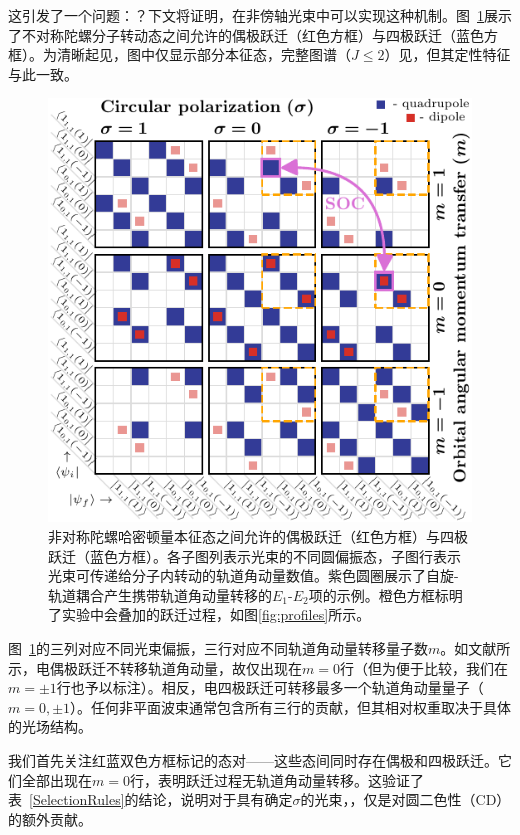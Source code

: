 \documentclass[reprint,aps,prl,twocolumn,superscriptaddress,groupedaddress]{revtex4-2}
\newcommand{\eoet}{$E_1$-$E_2$}
\begin{document}
这引发了一个问题：？下文将证明，在非傍轴光束中可以实现这种机制。图~\ref{fig:gridJ1}展示了不对称陀螺分子转动态之间允许的偶极跃迁（红色方框）与四极跃迁（蓝色方框）。为清晰起见，图中仅显示部分本征态，完整图谱（$J\leq 2$）见\cite{Note1}，但其定性特征与此一致。

\begin{figure}[ht!]
    \centering
    \includegraphics[width=\linewidth]{Figure1.pdf}
    \caption{非对称陀螺哈密顿量本征态之间允许的偶极跃迁（红色方框）与四极跃迁（蓝色方框）。各子图列表示光束的不同圆偏振态，子图行表示光束可传递给分子内转动的轨道角动量数值。紫色圆圈展示了自旋-轨道耦合产生携带轨道角动量转移的\eoet 项的示例。橙色方框标明了实验中会叠加的跃迁过程，如图\ref{fig:profiles}所示。}
    \label{fig:gridJ1}
\end{figure}
图~\ref{fig:gridJ1}的三列对应不同光束偏振，三行对应不同轨道角动量转移量子数$m$。如文献\cite{Maslov2024,Maslov_Thesis}所示，电偶极跃迁不转移轨道角动量，故仅出现在$m=0$行（但为便于比较，我们在$m=\pm 1$行也予以标注）。相反，电四极跃迁可转移最多一个轨道角动量量子（$m=0,\pm 1$）。任何非平面波束通常包含所有三行的贡献，但其相对权重取决于具体的光场结构。

我们首先关注红蓝双色方框标记的态对——这些态间同时存在偶极和四极跃迁。它们全部出现在$m=0$行，表明跃迁过程无轨道角动量转移。这验证了表~\ref{SelectionRules}的结论，说明对于具有确定$\sigma$的光束，，仅是对圆二色性（CD）的额外贡献。
\end{document}
